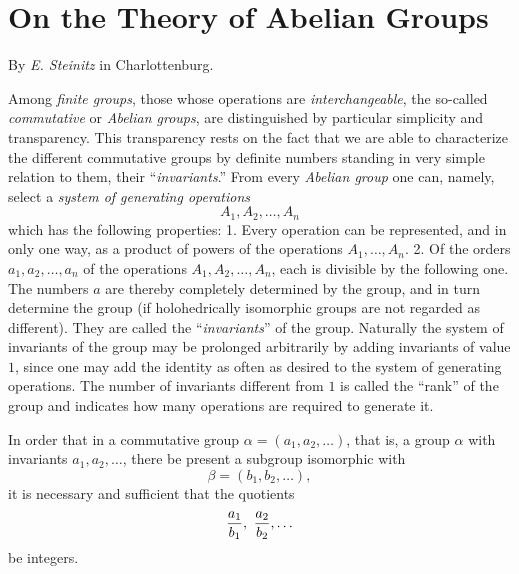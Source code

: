 \documentclass[11pt,a4paper]{article}
\begin{document}
\section*{On the Theory of Abelian Groups}
\begin{center}
By \emph{E. Steinitz} in Charlottenburg.
\end{center}

Among \emph{finite groups}, those whose operations are \emph{interchangeable}, the so-called \emph{commutative} or \emph{Abelian groups}, are distinguished by particular simplicity and transparency. This transparency rests on the fact that we are able to characterize the different commutative groups by definite numbers standing in very simple relation to them, their ``\emph{invariants}.'' From every \emph{Abelian group} one can, namely, select a \emph{system of generating operations}
\[
 A_1,A_2,\ldots,A_n
\]
which has the following properties: 1. Every operation can be represented, and in only one way, as a product of powers of the operations $A_1,\ldots,A_n$. 2. Of the orders $a_1,a_2,\ldots,a_n$ of the operations $A_1,A_2,\ldots,A_n$, each is divisible by the following one. The numbers $a$ are thereby completely determined by the group, and in turn determine the group (if holohedrically isomorphic groups are not regarded as different). They are called the ``\emph{invariants}'' of the group. Naturally the system of invariants of the group may be prolonged arbitrarily by adding invariants of value $1$, since one may add the identity as often as desired to the system of generating operations. The number of invariants different from $1$ is called the ``rank'' of the group and indicates how many operations are required to generate it.

In order that in a commutative group $\alpha=(a_1,a_2,\ldots)$, that is, a group $\alpha$ with invariants $a_1,a_2,\ldots$, there be present a subgroup isomorphic with
\[
 \beta=(b_1,b_2,\ldots),
\]
it is necessary and sufficient that the quotients
\[
 {a_1\over b_1},\ {a_2\over b_2},\ldots
\]
be integers.
\end{document}
